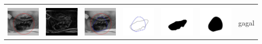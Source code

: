 \begin{table}[H]
\begin{tabular}{|m{0.7in}|m{0.7in}|m{0.7in}|m{0.7in}|m{0.7in}|m{0.7in}|m{0.7in}|}
		&  &  & & & &  \\
		\includegraphics[width=0.7in]{dataset/dataset_3/luka_hitam/ready/39_interp_init.jpg}&
		\includegraphics[width=0.7in]{dataset/dataset_3/luka_hitam/ready/39_interp_ext.jpg}&
		\includegraphics[width=0.7in]{dataset/dataset_3/luka_hitam/ready/39_interp_result.jpg}&
		\includegraphics[width=0.7in]{dataset/dataset_3/luka_hitam/ready/39_gt_r.jpg}&
		\includegraphics[width=0.7in]{dataset/dataset_3/luka_hitam/ready/39_r.jpg}&
		\includegraphics[width=0.7in]{dataset/dataset_3/luka_hitam/ready/39_interp_r.jpg}&
		gagal\\
		\hline
	\end{tabular}
\end{table}

